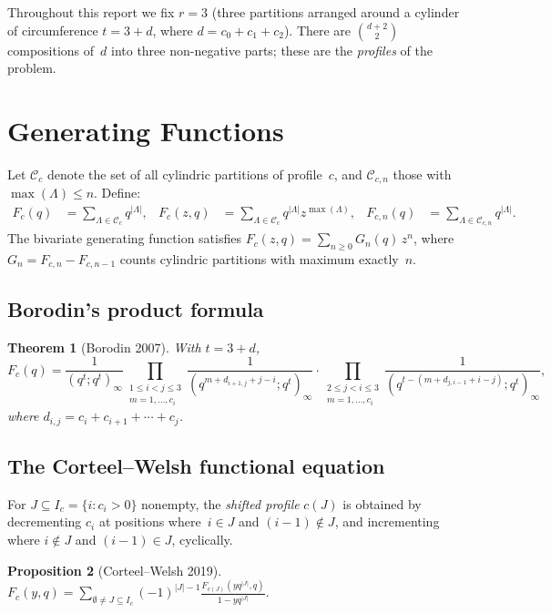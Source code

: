 \documentclass[11pt]{article}
\newtheorem{theorem}{Theorem}[section]
\newtheorem{proposition}[theorem]{Proposition}
\theoremstyle{definition}
\begin{document}
Throughout this report we fix $r = 3$ (three partitions arranged around a cylinder of circumference $t = 3 + d$, where $d = c_0 + c_1 + c_2$). There are $\binom{d+2}{2}$ compositions of~$d$ into three non-negative parts; these are the \emph{profiles} of the problem.

\section{Generating Functions}\label{sec:GF}

Let $\mathcal{C}_c$ denote the set of all cylindric partitions of profile~$c$, and $\mathcal{C}_{c,n}$ those with $\max(\Lambda) \leq n$. Define:
\begin{align}
F_c(q) &= \sum_{\Lambda \in \mathcal{C}_c} q^{|\Lambda|}, &
F_c(z,q) &= \sum_{\Lambda \in \mathcal{C}_c} q^{|\Lambda|} z^{\max(\Lambda)}, &
F_{c,n}(q) &= \sum_{\Lambda \in \mathcal{C}_{c,n}} q^{|\Lambda|}.
\end{align}
The bivariate generating function satisfies $F_c(z,q) = \sum_{n \geq 0} G_n(q)\, z^n$, where $G_n = F_{c,n} - F_{c,n-1}$ counts cylindric partitions with maximum exactly~$n$.

\subsection{Borodin's product formula}

\begin{theorem}[Borodin 2007]
With $t = 3 + d$,
\[
F_c(q) = \frac{1}{(q^t;q^t)_\infty} \prod_{\substack{1 \leq i < j \leq 3 \\ m=1,\ldots,c_i}} \frac{1}{(q^{m+d_{i+1,j}+j-i};q^t)_\infty} \cdot \prod_{\substack{2 \leq j < i \leq 3 \\ m=1,\ldots,c_i}} \frac{1}{(q^{t-(m+d_{j,i-1}+i-j)};q^t)_\infty},
\]
where $d_{i,j} = c_i + c_{i+1} + \cdots + c_j$.
\end{theorem}

\subsection{The Corteel--Welsh functional equation}

For $J \subseteq I_c = \{i : c_i > 0\}$ nonempty, the \emph{shifted profile} $c(J)$ is obtained by decrementing $c_i$ at positions where~$i \in J$ and $(i-1) \notin J$, and incrementing where $i \notin J$ and $(i-1) \in J$, cyclically.

\begin{proposition}[Corteel--Welsh 2019]\label{prop:CW}
$\displaystyle F_c(y,q) = \sum_{\emptyset \neq J \subseteq I_c} (-1)^{|J|-1} \frac{F_{c(J)}(yq^{|J|},q)}{1 - yq^{|J|}}.$
\end{proposition}
\end{document}
